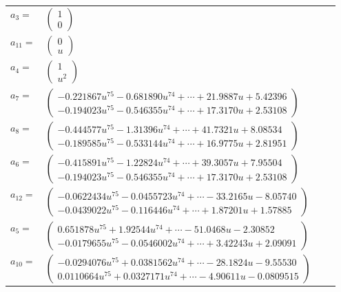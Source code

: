 \documentclass[1p]{elsarticle_modified}
\theoremstyle{definition}
\begin{document}
\begin{tabular}{m{7pt} m{180pt} m{7pt} m{180pt} }
\flushright $a_{3}=$&$\begin{pmatrix}1\\0\end{pmatrix}$ \\
\flushright $a_{11}=$&$\begin{pmatrix}0\\u\end{pmatrix}$ \\
\flushright $a_{4}=$&$\begin{pmatrix}1\\u^2\end{pmatrix}$ \\
\flushright $a_{7}=$&$\begin{pmatrix}-0.221867 u^{75}-0.681890 u^{74}+\cdots+21.9887 u+5.42396\\-0.194023 u^{75}-0.546355 u^{74}+\cdots+17.3170 u+2.53108\end{pmatrix}$ \\
\flushright $a_{8}=$&$\begin{pmatrix}-0.444577 u^{75}-1.31396 u^{74}+\cdots+41.7321 u+8.08534\\-0.189585 u^{75}-0.533144 u^{74}+\cdots+16.9775 u+2.81951\end{pmatrix}$ \\
\flushright $a_{6}=$&$\begin{pmatrix}-0.415891 u^{75}-1.22824 u^{74}+\cdots+39.3057 u+7.95504\\-0.194023 u^{75}-0.546355 u^{74}+\cdots+17.3170 u+2.53108\end{pmatrix}$ \\
\flushright $a_{12}=$&$\begin{pmatrix}-0.0622434 u^{75}-0.0455723 u^{74}+\cdots-33.2165 u-8.05740\\-0.0439022 u^{75}-0.116446 u^{74}+\cdots+1.87201 u+1.57885\end{pmatrix}$ \\
\flushright $a_{5}=$&$\begin{pmatrix}0.651878 u^{75}+1.92544 u^{74}+\cdots-51.0468 u-2.30852\\-0.0179655 u^{75}-0.0546002 u^{74}+\cdots+3.42243 u+2.09091\end{pmatrix}$ \\
\flushright $a_{10}=$&$\begin{pmatrix}-0.0294076 u^{75}+0.0381562 u^{74}+\cdots-28.1824 u-9.55530\\0.0110664 u^{75}+0.0327171 u^{74}+\cdots-4.90611 u-0.0809515\end{pmatrix}$ \\

\end{tabular}
\end{document}
